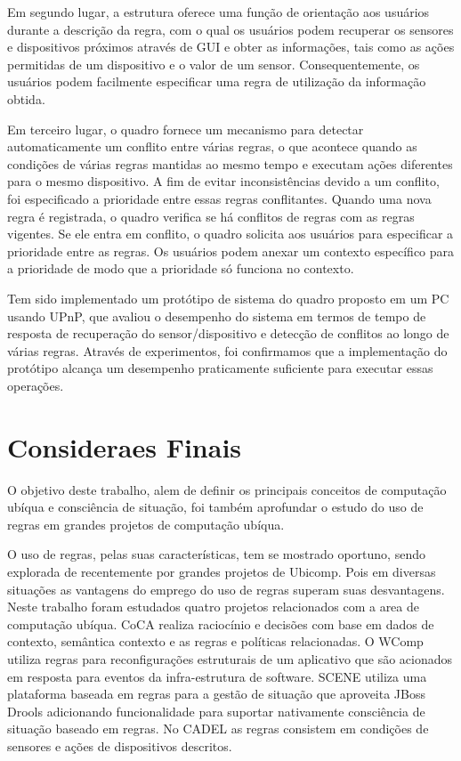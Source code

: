 \documentclass[12pt,a4paper,compsoc]{IEEEtran}
\begin{document}
  Em segundo lugar, a estrutura oferece uma função de orientação aos usuários durante a descrição
  da regra, com o qual os usuários podem recuperar os sensores e dispositivos próximos através de
  GUI e obter as informações, tais como as ações permitidas de um dispositivo e o valor de um
  sensor. Consequentemente, os usuários podem facilmente especificar uma regra de utilização da
  informação obtida.
  
  Em terceiro lugar, o quadro fornece um mecanismo para detectar automaticamente um conflito entre
  várias regras, o que acontece quando as condições de várias regras mantidas ao mesmo tempo e
  executam ações diferentes para o mesmo dispositivo. A fim de evitar inconsistências devido a um
  conflito, foi especificado a prioridade entre essas regras conflitantes. Quando uma nova regra é
  registrada, o quadro verifica se há conflitos de regras com as regras vigentes. Se ele entra em
  conflito, o quadro solicita aos usuários para especificar a prioridade entre as regras. Os
  usuários podem anexar um contexto específico para a prioridade de modo que a prioridade só
  funciona no contexto.
  
  Tem sido implementado um protótipo de sistema do quadro proposto em um PC usando UPnP, que
  avaliou o desempenho do sistema em termos de tempo de resposta de recuperação do
  sensor/dispositivo e detecção de conflitos ao longo de várias regras. Através de experimentos,
  foi confirmamos que a implementação do protótipo alcança um desempenho praticamente suficiente
  para executar essas operações.



\section{Consideraes Finais}

  O objetivo deste trabalho, alem de definir os principais conceitos de computação ubíqua e 
  consciência de situação, foi também aprofundar o estudo do uso de regras em grandes projetos de
  computação ubíqua.
  
  O uso de regras, pelas suas características, tem se mostrado oportuno, sendo explorada de 
  recentemente por grandes projetos de Ubicomp. Pois em diversas situações as vantagens do emprego
  do uso de regras superam suas desvantagens. Neste trabalho foram estudados quatro projetos
  relacionados com a area de computação ubíqua. CoCA realiza raciocínio e decisões com base em 
  dados de contexto, semântica contexto e as regras e políticas relacionadas. O WComp utiliza
  regras para reconfigurações estruturais de um aplicativo que são acionados em resposta para
  eventos da infra-estrutura de software. SCENE utiliza uma plataforma baseada em regras para a
  gestão de situação que aproveita JBoss Drools adicionando funcionalidade para suportar 
  nativamente consciência de situação baseado em regras. No CADEL as regras consistem em condições
  de sensores e ações de dispositivos descritos.
\end{document}
